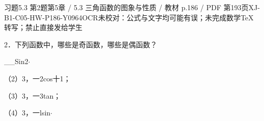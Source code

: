 \begin{bankitem}{习题5.3 第2题}{第5章 / 5.3 三角函数的图象与性质 / 教材 p.186 / PDF 第193页}{XJ-B1-C05-HW-P186-Y0964}{OCR未校对：公式与文字均可能有误；未完成数学TeX转写；禁止直接发给学生}
\begin{ocrdraft}
\par
2．下列函数中，哪些是奇函数，哪些是偶函数？
\par
\_\_Sin2\ensuremath{\cdot}
\par
（2）3，一2cos十1；
\par
（3）3，一3tan；
\par
（4）3，一lsin\ensuremath{\cdot}
\end{ocrdraft}
\end{bankitem}
